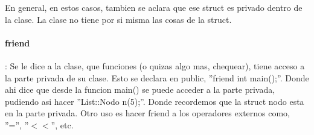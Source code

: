 \documentclass[11pt]{article}
\begin{document}
En general, en estos casos, tambien se aclara que ese struct es privado dentro
de la clase.
La clase no tiene por si misma las cosas de la struct.

\vspace{0.5cm}
\paragraph{friend}: Se le dice a la clase, que funciones (o quizas algo mas, chequear),
tiene  acceso a la parte privada de su clase.
Esto se declara en public, ''friend int main();''.
Donde ahi dice que desde la funcion main() se puede acceder a la parte privada,
pudiendo asi hacer ''List::Nodo n(5);''.
Donde recordemos que la struct nodo esta en la parte privada.
Otro uso es hacer friend a los operadores externos como, ''='', ''$<<$'', etc.
\end{document}
